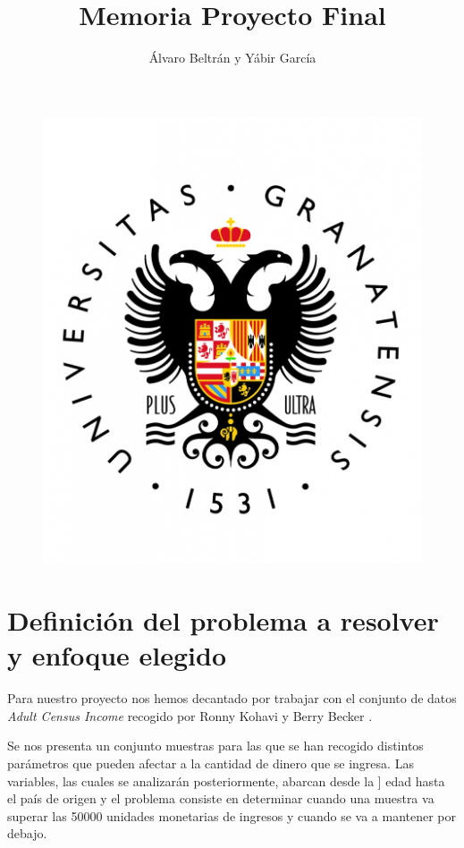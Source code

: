\documentclass[11pt]{article}
\title{Memoria Proyecto Final}
\author{Álvaro Beltrán y Yábir García}
\begin{document}
\maketitle

\begin{figure}[h]
\includegraphics[scale=0.3]{UGR}
\centering
\end{figure}

\newpage

\renewcommand*\contentsname{Índice}
\tableofcontents

\newpage

\section{Definición del problema a resolver y enfoque elegido}

Para nuestro proyecto nos hemos decantado por trabajar con el conjunto de datos
\textit{Adult Census Income} recogido por Ronny Kohavi y Berry Becker \cite{dataset}. 

Se nos presenta un conjunto muestras para las que se han recogido distintos
parámetros que pueden afectar a la cantidad de dinero que se ingresa. Las
variables, las cuales se analizarán posteriormente, abarcan desde la ] edad
hasta el país de origen y el problema consiste en determinar cuando una muestra
va superar las 50000 unidades monetarias de ingresos y cuando se va a mantener
por debajo.
\end{document}
